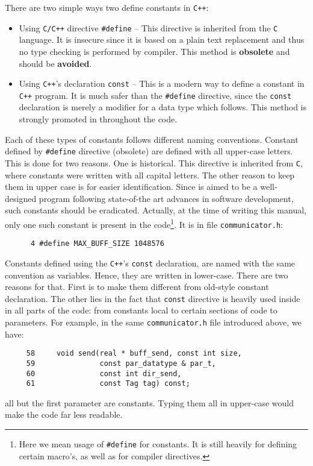 There are two simple ways two define constants in {\tt C++}:

\begin{itemize}
  \item Using {\tt C/C++} directive {\tt \#define} -- This directive is inherited
        from the {\tt C} language. It is insecure since it is based on a plain
        text replacement and thus no type checking is performed by compiler. 
        This method is {\bf obsolete} and should be {\bf avoided}.
  \item Using {\tt C++}'s declaration {\tt const} -- This is a modern way to define
        a constant in {\tt C++} program. It is much safer than the {\tt \#define}
        directive, since the {\tt const} declaration is merely a modifier for
        a data type which follows. This method is strongly promoted in {\psiboil}
        throughout the code.
\end{itemize}

Each of these types of constants follows different naming conventions. Constant 
defined by {\tt \#define} directive (obsolete) are defined with all upper-case
letters. This is done for two reasons. One is historical. This directive is
inherited from {\tt C}, where constants were written with all capital letters.
The other reason to keep them in upper case is for easier identification. Since
{\psiboil} is aimed to be a well-designed program following state-of-the art
advances in software development, such constants should be eradicated. Actually,
at the time of writing this manual, only one such constant is present in the
code\footnote{Here we mean usage of {\tt \#define} for constants. It is still
heavily for defining certain macro's, as well as for compiler directives.}. 
It is in file {\tt communicator.h}:
%
{\small \begin{verbatim}
      4 #define MAX_BUFF_SIZE 1048576
\end{verbatim}}
%
Constants defined using the {\tt C++}'s {\tt const} declaration, are named with
the same convention as variables. Hence, they are written in lower-case. There 
are two reasons for that. First is to make them different from old-style constant
declaration. The other lies in the fact that {\tt const} directive is heavily
used inside {\psiboil} in all parts of the code: from constants local to certain
sections of code to parameters. For example, in the same {\tt communicator.h} 
file introduced above, we have:
%
{\small \begin{verbatim}
     58     void send(real * buff_send, const int size,
     59               const par_datatype & par_t,
     60               const int dir_send,
     61               const Tag tag) const;
\end{verbatim}}
%
all but the first parameter are constants. Typing them all in upper-case would
make the code far less readable.


